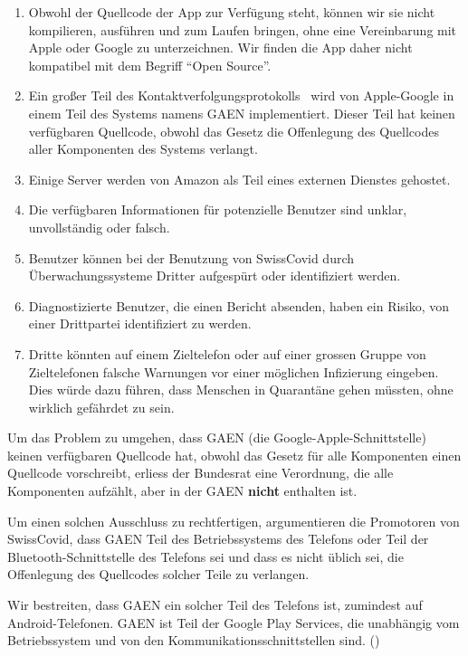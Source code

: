 \begin{enumerate}
\def\labelenumi{\arabic{enumi}.}
\tightlist
\item
  Obwohl der Quellcode der App zur Verfügung steht, können wir sie nicht
  kompilieren, ausführen und zum Laufen bringen, ohne eine Vereinbarung
  mit Apple oder Google zu unterzeichnen. Wir finden die App daher nicht
  kompatibel mit dem Begriff ``Open Source''.
\item
  Ein großer Teil des Kontakt­verfolgungs­protokolls~ wird von
  Apple-Google in einem Teil des Systems namens GAEN implementiert.
  Dieser Teil hat keinen verfügbaren Quellcode, obwohl das Gesetz die
  Offenlegung des Quellcodes aller Komponenten des Systems verlangt.
\item
  Einige Server werden von Amazon als Teil eines externen Dienstes
  gehostet.
\item
  Die verfügbaren Informationen für potenzielle Benutzer sind unklar,
  unvollständig oder falsch.
\item
  Benutzer können bei der Benutzung von SwissCovid durch
  Überwachungssysteme Dritter aufgespürt oder identifiziert werden.
\item
  Diagnostizierte Benutzer, die einen Bericht absenden, haben ein
  Risiko, von einer Drittpartei identifiziert zu werden.
\item
  Dritte könnten auf einem Zieltelefon oder auf einer grossen Gruppe von
  Zieltelefonen falsche Warnungen vor einer möglichen Infizierung
  eingeben. Dies würde dazu führen, dass Menschen in Quarantäne gehen
  müssten, ohne wirklich gefährdet zu sein.
\end{enumerate}

Um das Problem zu umgehen, dass GAEN (die Google-Apple-Schnittstelle)
keinen verfügbaren Quellcode hat, obwohl das Gesetz für alle Komponenten
einen Quellcode vorschreibt, erliess der Bundesrat eine Verordnung, die
alle Komponenten aufzählt, aber in der GAEN \textbf{nicht} enthalten
ist.

Um einen solchen Ausschluss zu rechtfertigen, argumentieren die
Promotoren von SwissCovid, dass GAEN Teil des Betriebssystems des
Telefons oder Teil der Bluetooth-Schnittstelle des Telefons sei und dass
es nicht üblich sei, die Offenlegung des Quellcodes solcher Teile zu
verlangen.

Wir bestreiten, dass GAEN ein solcher Teil des Telefons ist, zumindest
auf Android-Telefonen. GAEN ist Teil der Google Play Services, die
unabhängig vom Betriebssystem und von den Kommunikations­schnittstellen
sind. ()

